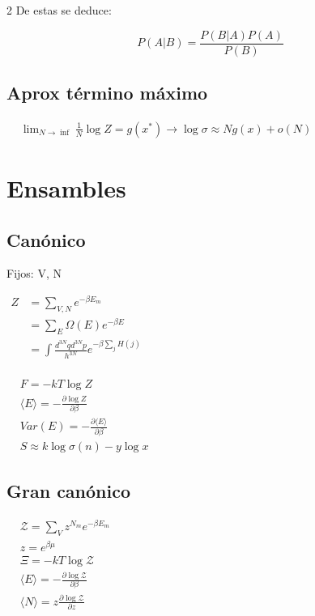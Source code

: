 \documentclass{article}
\begin{document}
\begin{multicols}{2}
De estas se deduce:

\begin{equation*}
    P(A | B) = \frac{P(B | A)P(A)}{P(B)}
\end{equation*}

\subsection{Aprox término máximo}
$
\begin{aligned}
    &\lim_{N \to \inf} \frac{1}{N} \log{Z} = g(x^*) \rightarrow \log{\sigma} \approx Ng(x) + o(N)
\end{aligned}
$

\section*{Ensambles}

\subsection{Canónico}
Fijos: {V, N}

$
\begin{aligned}
    Z &= \sum_{{V,N}} e^{-\beta E_m} \\
    &= \sum_{E} \Omega(E) e^{-\beta E} \\
    &= \int \frac{d^{3N}q d^{3N}p}{h^{3N}} e^{-\beta \sum_{j} H(j)}\ \\
\end{aligned}
$

$
\begin{aligned}
    &F = -kT\log{Z} \\
    &\langle E \rangle = - \frac{\partial \log{Z}}{\partial \beta} \\
    &Var(E) = - \frac{\partial \langle E \rangle}{\partial \beta}\\
    &S \approx k\log \sigma(n) - y\log x
\end{aligned}
$

\subsection{Gran canónico}
$
\begin{aligned}
    &\mathcal{Z} = \sum_{{V}} z^{N_m} e^{-\beta E_m} \\
    &z = e^{\beta \mu} \\
    &\Xi = -kT\log{\mathcal{Z}} \\
    &\langle E \rangle = - \frac{\partial \log{\mathcal{Z}}}{\partial \beta} \\
    &\langle N \rangle = z \frac{\partial \log{\mathcal{Z}}}{\partial z}\\
\end{aligned}
$


\end{multicols}
\end{document}
